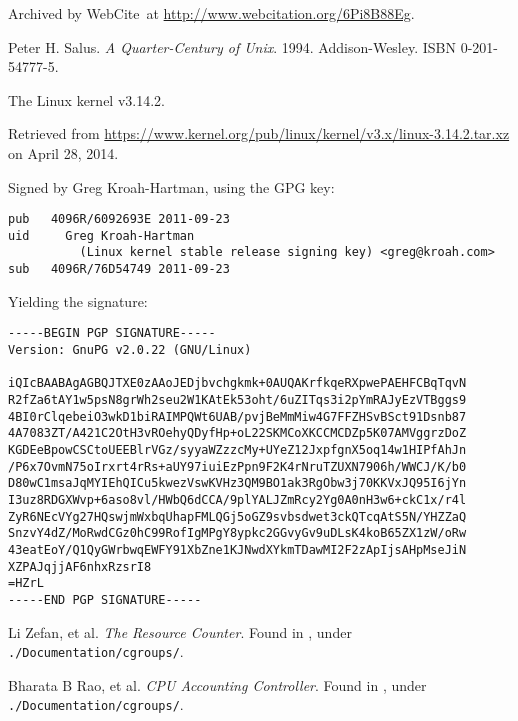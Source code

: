 \begin{thebibliography}{9}
Archived by WebCite\textsuperscript{\textregistered}\ at
\url{http://www.webcitation.org/6Pi8B88Eg}.


Peter H. Salus. \emph{A Quarter-Century of Unix}. 1994. Addison-Wesley. ISBN
0-201-54777-5.


The Linux kernel v3.14.2.

Retrieved from
\url{https://www.kernel.org/pub/linux/kernel/v3.x/linux-3.14.2.tar.xz} on April
28, 2014.

Signed by Greg Kroah-Hartman, using the GPG key:

\begin{lstlisting}
pub   4096R/6092693E 2011-09-23
uid     Greg Kroah-Hartman
          (Linux kernel stable release signing key) <greg@kroah.com>
sub   4096R/76D54749 2011-09-23
\end{lstlisting}

Yielding the signature:

\begin{lstlisting}
-----BEGIN PGP SIGNATURE-----
Version: GnuPG v2.0.22 (GNU/Linux)

iQIcBAABAgAGBQJTXE0zAAoJEDjbvchgkmk+0AUQAKrfkqeRXpwePAEHFCBqTqvN
R2fZa6tAY1w5psN8grWh2seu2W1KAtEk53oht/6uZITqs3i2pYmRAJyEzVTBggs9
4BI0rClqebeiO3wkD1biRAIMPQWt6UAB/pvjBeMmMiw4G7FFZHSvBSct91Dsnb87
4A7083ZT/A421C2OtH3vROehyQDyfHp+oL22SKMCoXKCCMCDZp5K07AMVggrzDoZ
KGDEeBpowCSCtoUEEBlrVGz/syyaWZzzcMy+UYeZ12JxpfgnX5oq14w1HIPfAhJn
/P6x7OvmN75oIrxrt4rRs+aUY97iuiEzPpn9F2K4rNruTZUXN7906h/WWCJ/K/b0
D80wC1msaJqMYIEhQICu5kwezVswKVHz3QM9BO1ak3RgObw3j70KKVxJQ95I6jYn
I3uz8RDGXWvp+6aso8vl/HWbQ6dCCA/9plYALJZmRcy2Yg0A0nH3w6+ckC1x/r4l
ZyR6NEcVYg27HQswjmWxbqUhapFMLQGj5oGZ9svbsdwet3ckQTcqAtS5N/YHZZaQ
SnzvY4dZ/MoRwdCGz0hC99RofIgMPgY8ypkc2GGvyGv9uDLsK4koB65ZX1zW/oRw
43eatEoY/Q1QyGWrbwqEWFY91XbZne1KJNwdXYkmTDawMI2F2zApIjsAHpMseJiN
XZPAJqjjAF6nhxRzsrI8
=HZrL
-----END PGP SIGNATURE-----
\end{lstlisting}


Li Zefan, et al.  \emph{The Resource Counter}. Found in
\cite{linux-kernel-v3.14.2}, under \texttt{./Documentation/cgroups/}.


Bharata B Rao, et al. \emph{CPU Accounting Controller}.  Found in
\cite{linux-kernel-v3.14.2}, under \texttt{./Documentation/cgroups/}.


\end{thebibliography}
